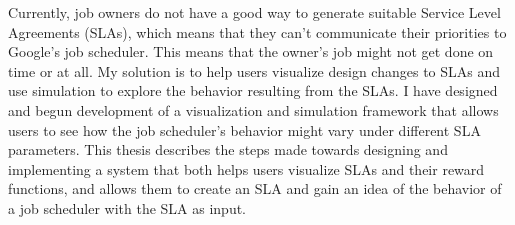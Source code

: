 % 
% 
%
Currently, job owners do not have a good way to generate suitable Service Level Agreements (SLAs), which means that they can't communicate their priorities to Google's job scheduler. This means that the owner's job might not get done on time or at all. My solution is to help users visualize design changes to SLAs and use simulation to explore the behavior resulting from the SLAs. I have designed and begun development of a visualization and simulation framework that allows users to see how the job scheduler's behavior might vary under different SLA parameters. This thesis describes the steps made towards designing and implementing a system that both helps users visualize SLAs and their reward functions, and allows them to create an SLA and gain an idea of the behavior of a job scheduler with the SLA as input.
